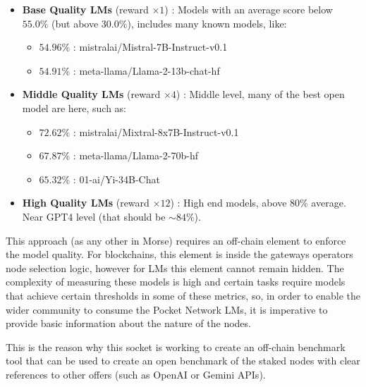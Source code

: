 \begin{itemize}
    \item \textbf{Base Quality LMs} (reward $\times 1$) : Models with an average score below $55.0\%$ (but above $30.0\%$), includes many known models, like:
    \begin{itemize}
        \item $54.96\%$ : mistralai/Mistral-7B-Instruct-v0.1
        \item $54.91\%$ : meta-llama/Llama-2-13b-chat-hf
    \end{itemize}
    \item \textbf{Middle Quality LMs} (reward $\times 4$) : Middle level, many of the best open model are here, such as:
    \begin{itemize}
        \item $72.62\%$ : mistralai/Mixtral-8x7B-Instruct-v0.1        
        \item $67.87\%$ : meta-llama/Llama-2-70b-hf
        \item $65.32\%$ : 01-ai/Yi-34B-Chat
    \end{itemize}
    \item \textbf{High Quality LMs} (reward $\times 12$) : High end models, above $80\%$ average. Near GPT4 level (that should be $\sim84\%$).
\end{itemize}

This approach (as any other in Morse) requires an off-chain element to enforce the model quality. For blockchains, this element is inside the gateways operators node selection logic, however for \glspl{LM} this element cannot remain hidden. The complexity of measuring these models is high and certain tasks require models that achieve certain thresholds in some of these metrics, so, in order to enable the wider community to consume the Pocket Network \glspl{LM}, it is imperative to provide basic information about the nature of the nodes. 

This is the reason why this socket is working to create an off-chain benchmark tool that can be used to create an open benchmark of the staked nodes with clear references to other offers (such as OpenAI or Gemini APIs).



